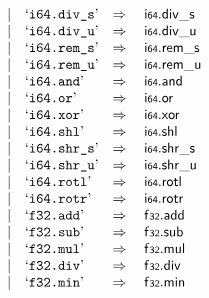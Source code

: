 $$\begin{array}[t]{@{}lrrl@{}l@{}l@{}l@{}}
& & | & \mbox{‘\texttt{i64.div\_s}’} & \quad\Rightarrow\quad{} & \mathsf{i{\scriptstyle 64}} {.} {\mathsf{div}}{\mathsf{\_}}{\mathsf{s}} \\
& & | & \mbox{‘\texttt{i64.div\_u}’} & \quad\Rightarrow\quad{} & \mathsf{i{\scriptstyle 64}} {.} {\mathsf{div}}{\mathsf{\_}}{\mathsf{u}} \\
& & | & \mbox{‘\texttt{i64.rem\_s}’} & \quad\Rightarrow\quad{} & \mathsf{i{\scriptstyle 64}} {.} {\mathsf{rem}}{\mathsf{\_}}{\mathsf{s}} \\
& & | & \mbox{‘\texttt{i64.rem\_u}’} & \quad\Rightarrow\quad{} & \mathsf{i{\scriptstyle 64}} {.} {\mathsf{rem}}{\mathsf{\_}}{\mathsf{u}} \\
& & | & \mbox{‘\texttt{i64.and}’} & \quad\Rightarrow\quad{} & \mathsf{i{\scriptstyle 64}} {.} \mathsf{and} \\
& & | & \mbox{‘\texttt{i64.or}’} & \quad\Rightarrow\quad{} & \mathsf{i{\scriptstyle 64}} {.} \mathsf{or} \\
& & | & \mbox{‘\texttt{i64.xor}’} & \quad\Rightarrow\quad{} & \mathsf{i{\scriptstyle 64}} {.} \mathsf{xor} \\
& & | & \mbox{‘\texttt{i64.shl}’} & \quad\Rightarrow\quad{} & \mathsf{i{\scriptstyle 64}} {.} \mathsf{shl} \\
& & | & \mbox{‘\texttt{i64.shr\_s}’} & \quad\Rightarrow\quad{} & \mathsf{i{\scriptstyle 64}} {.} {\mathsf{shr}}{\mathsf{\_}}{\mathsf{s}} \\
& & | & \mbox{‘\texttt{i64.shr\_u}’} & \quad\Rightarrow\quad{} & \mathsf{i{\scriptstyle 64}} {.} {\mathsf{shr}}{\mathsf{\_}}{\mathsf{u}} \\
& & | & \mbox{‘\texttt{i64.rotl}’} & \quad\Rightarrow\quad{} & \mathsf{i{\scriptstyle 64}} {.} \mathsf{rotl} \\
& & | & \mbox{‘\texttt{i64.rotr}’} & \quad\Rightarrow\quad{} & \mathsf{i{\scriptstyle 64}} {.} \mathsf{rotr} \\
& & | & \mbox{‘\texttt{f32.add}’} & \quad\Rightarrow\quad{} & \mathsf{f{\scriptstyle 32}} {.} \mathsf{add} \\
& & | & \mbox{‘\texttt{f32.sub}’} & \quad\Rightarrow\quad{} & \mathsf{f{\scriptstyle 32}} {.} \mathsf{sub} \\
& & | & \mbox{‘\texttt{f32.mul}’} & \quad\Rightarrow\quad{} & \mathsf{f{\scriptstyle 32}} {.} \mathsf{mul} \\
& & | & \mbox{‘\texttt{f32.div}’} & \quad\Rightarrow\quad{} & \mathsf{f{\scriptstyle 32}} {.} \mathsf{div} \\
& & | & \mbox{‘\texttt{f32.min}’} & \quad\Rightarrow\quad{} & \mathsf{f{\scriptstyle 32}} {.} \mathsf{min} \\

\end{array}$$
